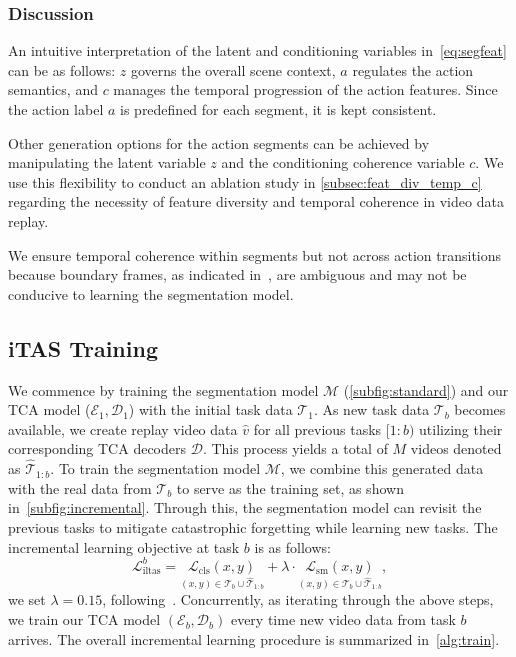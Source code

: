 \subsubsection{Discussion} 

An intuitive interpretation of the latent and conditioning variables in~\cref{eq:segfeat} can be as follows: $z$ governs the overall scene context, $a$ regulates the action semantics, and $c$ manages the temporal progression of the action features. Since the action label $a$ is predefined for each segment, it is kept consistent. 

Other generation options for the action segments can be achieved by manipulating the latent variable $z$ and the conditioning coherence variable $c$. We use this flexibility to conduct an ablation study in \cref{subsec:feat_div_temp_c} regarding the necessity of feature diversity and temporal coherence in video data replay.

We ensure temporal coherence within segments but not across action transitions because boundary frames, as indicated in~\cite{souri2022robust,ding2022leveraging}, are ambiguous and may not be conducive to learning the segmentation model.

\subsection{iTAS Training}



We commence by training the segmentation model $\mathcal{M}$ (\cref{subfig:standard}) and our TCA model ($\mathcal{E}_1, \mathcal{D}_1$) with the initial task data $\mathcal{T}_1$. As new task data $\mathcal{T}_b$ becomes available, we create replay video data $\hat{v}$ for all previous tasks $[1\!:\!b)$ utilizing their corresponding TCA decoders $\mathcal{D}$. This process yields a total of $M$ videos denoted as $\hat{\mathcal{T}}_{1:b}$.
To train the segmentation model $\mathcal{M}$, we combine this generated data with the real data from $\mathcal{T}_b$ to serve as the training set, as shown in~\cref{subfig:incremental}. Through this, the segmentation model can revisit the previous tasks to mitigate catastrophic forgetting while learning new tasks. The incremental learning objective at task $b$ is as follows: 
\begin{equation}\label{eq:iltas}
    \mathcal{L}^b_{\text{iltas}} = \underset{(x,y)\in\mathcal{T}_b\cup \hat{\mathcal{T}}_{1:b}}{\mathcal{L}_{\text{cls}}(x,y)} + \lambda \cdot \underset{(x,y)\in\mathcal{T}_b\cup \hat{\mathcal{T}}_{1:b}}{\mathcal{L}_{\text{sm}}(x,y)},
\end{equation}
we set $\lambda=0.15$, following~\cite{farha2019ms}. Concurrently, as iterating through the above steps, we train our TCA model $(\mathcal{E}_b, \mathcal{D}_b)$ every time new video data from task $b$ arrives. The overall incremental learning procedure is summarized in~\cref{alg:train}.



